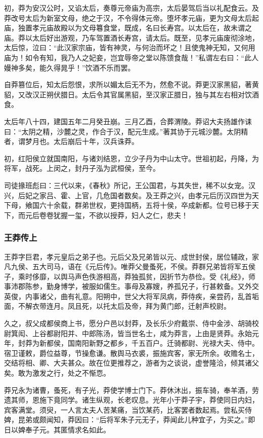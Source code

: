 \documentclass[]{article}
\begin{document}
初，莽为安汉公时，又谄太后，奏尊元帝庙为高宗，太后晏驾后当以礼配食云。及莽改号太后为新室文母，绝之于汉，不令得体元帝。堕坏孝元庙，更为文母太后起庙，独置孝元庙故殿以为文母篹食堂，既成，名曰长寿宫。以太后在，故未谓之庙。莽以太后好出游观，乃车驾置酒长寿宫，请太后。既至，见孝元庙废彻涂地，太后惊，泣曰：``此汉家宗庙，皆有神灵，与何治而坏之！且使鬼神无知，又何用庙为！如令有知，我乃人之妃妾，岂宜辱帝之堂以陈馈食哉！''私谓左右曰：``此人嫚神多矣，能久得晁乎！''饮酒不乐而罢。

自莽篡位后，知太后怨恨，求所以媚太后无不为，然愈不说。莽更汉家黑貂，著黄貂，又改汉正朔伏腊日。太后令其官属黑貂，至汉家正腊日，独与其左右相对饮酒食。

太后年八十四，建国五年二月癸丑崩。三月乙酉，合葬渭陵。莽诏大夫扬雄作诔曰：``太阴之精，沙麓之灵，作合于汉，配元生成。''著其协于元城沙麓。太阴精者，谓梦月也。太后崩后十年，汉兵诛莽。

初，红阳侯立就国南阳，与诸刘结恩，立少子丹为中山太守。世祖初起，丹降，为将军，战死。上闵之，封丹子泓为武桓侯，至今。

司徒掾班彪曰：三代以来，《春秋》所记，王公国君，与其失世，稀不以女宠。汉兴，后妃之家吕、霍、上官，几危国者数矣。及王莽之兴，由孝元后历汉四世为天下母，飨国六十余载，群弟世权，更持国柄，五将十侯，卒成新都。位号已移于天下，而元后卷卷犹握一玺，不欲以授莽，妇人之仁，悲夫！

\hypertarget{header-n6728}{%
\subsubsection{王莽传上}\label{header-n6728}}

王莽字巨君，孝元皇后之弟子也。元后父及兄弟皆以元、成世封侯，居位辅政，家凡九侯、五大司马，语在《元后传》。唯莽父曼蚤死，不侯。莽群兄弟皆将军五侯子，乘时侈靡，以舆马声色佚游相高，莽独孤贫，因折节为恭俭。受《礼经》，师事沛郡陈参，勤身博学，被服如儒生。事母及寡嫂，养孤兄子，行甚敕备。又外交英俊，内事诸父，曲有礼意。阳朔中，世父大将军凤病，莽侍疾，亲尝药，乱首垢面，不解衣带连月。凤且死，以托太后及帝，拜为黄门郎，迁射声校尉。

久之，叔父成都侯商上书，愿分户邑以封莽，及长乐少府戴崇、侍中金涉、胡骑校尉箕闳、上谷都尉阳并、中郎陈汤，皆当世名士，咸为莽言，上由是贤莽。永始元年，封莽为新都侯，国南阳新野之都乡，千五百户。迁骑都尉、光禄大夫、侍中。宿卫谨敕，爵位益尊，节操愈谦。散舆马衣裘，振施宾客，家无所余。收赡名士，交结将相、卿、大夫甚众。故在位更推荐之，游者为之谈说，虚誉隆洽，倾其诸父矣。敢为激发之行，处之不惭恧。

莽兄永为诸曹，蚤死，有子光，莽使学博士门下。莽休沐出，振车骑，奉羊酒，劳遗其师，恩施下竟同学。诸生纵观，长老叹息。光年小于莽子宇，莽使同日内妇，宾客满堂。须臾，一人言太夫人苦某痛，当饮某药，比客罢者数起焉。尝私买侍婢，昆弟或颇闻知，莽因曰：``后将军朱子元无子，莽闻此儿种宜子，为买之。''即日以婢奉子元。其匿情求名如此。
\end{document}
